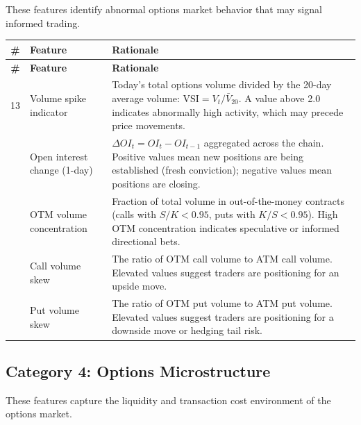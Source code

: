 \documentclass[11pt,a4paper]{article}
\begin{document}
These features identify abnormal options market behavior that may signal informed trading.

\begin{longtable}{@{}cp{3cm}p{8cm}@{}}
\toprule
\textbf{\#} & \textbf{Feature} & \textbf{Rationale} \\
\midrule
\endfirsthead
\toprule
\textbf{\#} & \textbf{Feature} & \textbf{Rationale} \\
\midrule
\endhead
13 & Volume spike indicator & Today's total options volume divided by the 20-day average volume: $\text{VSI} = V_t / \bar{V}_{20}$. A value above 2.0 indicates abnormally high activity, which may precede price movements. \\
\addlinespace
14 & Open interest change (1-day) & $\Delta OI_t = OI_t - OI_{t-1}$ aggregated across the chain. Positive values mean new positions are being established (fresh conviction); negative values mean positions are closing. \\
\addlinespace
15 & OTM volume concentration & Fraction of total volume in out-of-the-money contracts (calls with $S/K < 0.95$, puts with $K/S < 0.95$). High OTM concentration indicates speculative or informed directional bets. \\
\addlinespace
16 & Call volume skew & The ratio of OTM call volume to ATM call volume. Elevated values suggest traders are positioning for an upside move. \\
\addlinespace
17 & Put volume skew & The ratio of OTM put volume to ATM put volume. Elevated values suggest traders are positioning for a downside move or hedging tail risk. \\
\bottomrule
\end{longtable}

\subsection{Category 4: Options Microstructure}

These features capture the liquidity and transaction cost environment of the options market.
\end{document}
